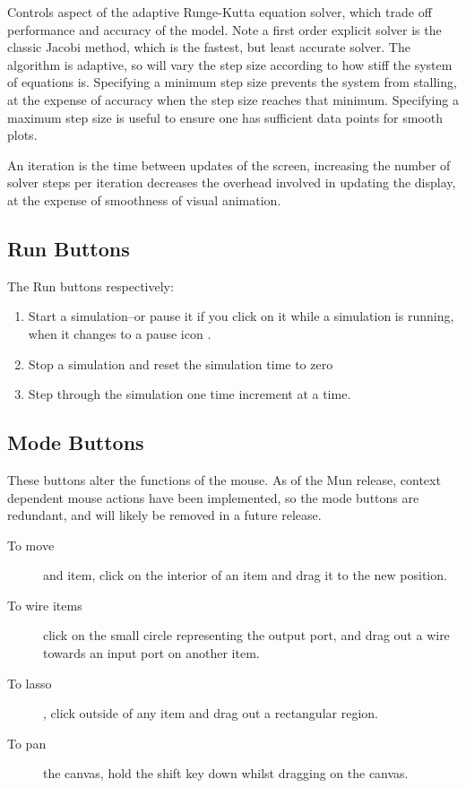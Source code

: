 Controls aspect of the adaptive Runge-Kutta equation solver, which
trade off performance and accuracy of the model. Note a first order
explicit solver is the classic Jacobi method, which is the fastest,
but least accurate solver. The algorithm is adaptive, so will vary the
step size according to how stiff the system of equations
is. Specifying a minimum step size prevents the system from stalling,
at the expense of accuracy when the step size reaches that
minimum. Specifying a maximum step size is useful to ensure one has
sufficient data points for smooth plots.

An iteration is the time between updates of the screen, increasing the
number of solver steps per iteration decreases the overhead involved
in updating the display, at the expense of smoothness of visual
animation.

\subsection{Run Buttons}
\label{RunButtons}


The Run buttons respectively:
\begin{enumerate}
\item    Start a simulation--or pause it if you click on it while a
simulation is running, when it changes to a pause icon .
\item Stop a simulation and reset the simulation time to zero
\item Step through the simulation one time increment at a time.
\end{enumerate}

\subsection{Mode Buttons}
\label{ModeButtons}



These buttons alter the functions of the mouse. As of the Mun release,
context dependent mouse actions have been implemented, so the mode
buttons are redundant, and will likely be removed in a future release.

\begin{description}
\item[To move] and item, click on the interior of an item and drag it
to the new position.
\item[To wire items] click on the small circle representing the output
port, and drag out a wire towards an input port on another item.
\item[To lasso], click outside of any item and drag out a rectangular
region.
\item[To pan] the canvas, hold the shift key down whilst dragging on
the canvas.
\end{description}

